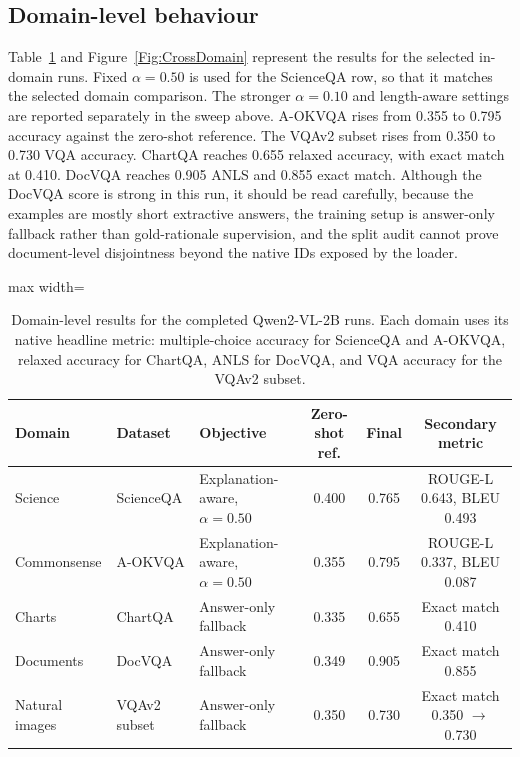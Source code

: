 \documentclass[preprint,12pt]{elsarticle}
\begin{document}
\subsection{Domain-level behaviour}
Table~\ref{tab:domain_results} and Figure~\ref{Fig:CrossDomain} represent the results for the selected in-domain runs.
Fixed $\alpha=0.50$ is used for the ScienceQA row, so that it matches the selected domain comparison.
The stronger $\alpha=0.10$ and length-aware settings are reported separately in the sweep above.
A-OKVQA rises from 0.355 to 0.795 accuracy against the zero-shot reference.
The VQAv2 subset rises from 0.350 to 0.730 VQA accuracy.
ChartQA reaches 0.655 relaxed accuracy, with exact match at 0.410.
DocVQA reaches 0.905 ANLS and 0.855 exact match.
Although the DocVQA score is strong in this run, it should be read carefully, because the examples are mostly short extractive answers, the training setup is answer-only fallback rather than gold-rationale supervision, and the split audit cannot prove document-level disjointness beyond the native IDs exposed by the loader.

\begin{table}[!htbp]
\centering
\caption{Domain-level results for the completed Qwen2-VL-2B runs. Each domain uses its native headline metric: multiple-choice accuracy for ScienceQA and A-OKVQA, relaxed accuracy for ChartQA, ANLS for DocVQA, and VQA accuracy for the VQAv2 subset.}
\label{tab:domain_results}
\scriptsize
\begin{adjustbox}{max width=\textwidth}
\begin{tabular}{|l|l|l|c|c|c|}
\hline
\textbf{Domain} & \textbf{Dataset} & \textbf{Objective} & \textbf{Zero-shot ref.} & \textbf{Final} & \textbf{Secondary metric} \\ \hline
Science & ScienceQA & Explanation-aware, $\alpha=0.50$ & 0.400 & 0.765 & ROUGE-L 0.643, BLEU 0.493 \\
Commonsense & A-OKVQA & Explanation-aware, $\alpha=0.50$ & 0.355 & 0.795 & ROUGE-L 0.337, BLEU 0.087 \\
Charts & ChartQA & Answer-only fallback & 0.335 & 0.655 & Exact match 0.410 \\
Documents & DocVQA & Answer-only fallback & 0.349 & 0.905 & Exact match 0.855 \\
Natural images & VQAv2 subset & Answer-only fallback & 0.350 & 0.730 & Exact match 0.350 $\rightarrow$ 0.730 \\ \hline
\end{tabular}
\end{adjustbox}
\end{table}
\end{document}
